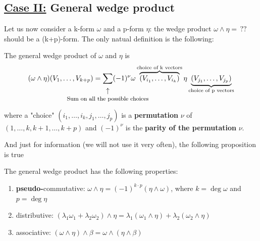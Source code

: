 \documentclass[../main.tex]{subfiles}
\begin{document}
\subsection{\underline{Case II:} General wedge product}Let us now consider a k-form $\omega$ and a p-form $\eta$: the wedge product $\omega\wedge\eta=\,??$ should be a (k+p)-form. The only natual definition is the following:
\begin{definition}
The general wedge product of $\omega$ and $\eta$ is
\[
(\omega\wedge\eta)(V_1,\dots,V_{k+p})= \underset{\mathclap{\tikz \node {$\uparrow$} node [below=1ex] {\footnotesize Sum on all the possible choices };}} \sum(-1)^{\nu}\omega \overbrace{(V_{i_1},\dots,V_{i_k})}^{\textrm{choice of k vectors}} \eta \underbrace{(V_{j_1},\dots,V_{j_p})}_{\textrm{choice of p vectors}}
\]
where a "choice" $(i_1,\dots,i_k,j_1,\dots,j_p)$ is a \textbf{permutation} $\nu$ of $(1,\dots,k,k+1,\dots,k+p)$ and $(-1)^{\nu}$ is the \textbf{parity of the permutation} $\nu$.
\end{definition}
And just for information (we will not use it very often), the following proposition is true
\begin{proposition}
The general wedge product has the following properties:
\begin{enumerate}
    \item \textbf{pseudo-}commutative: $\omega\wedge\eta=(-1)^{k\cdot p}(\eta\wedge\omega)$, where $k=\deg\omega$ and $p=\deg\eta$
    \item distributive: $(\lambda_1\omega_1+\lambda_2\omega_2)\wedge\eta=\lambda_1(\omega_1\wedge\eta)+\lambda_2(\omega_2\wedge\eta)$
    \item associative: $(\omega\wedge\eta)\wedge\beta=\omega\wedge(\eta\wedge\beta)$
\end{enumerate}
\end{proposition}
\end{document}
